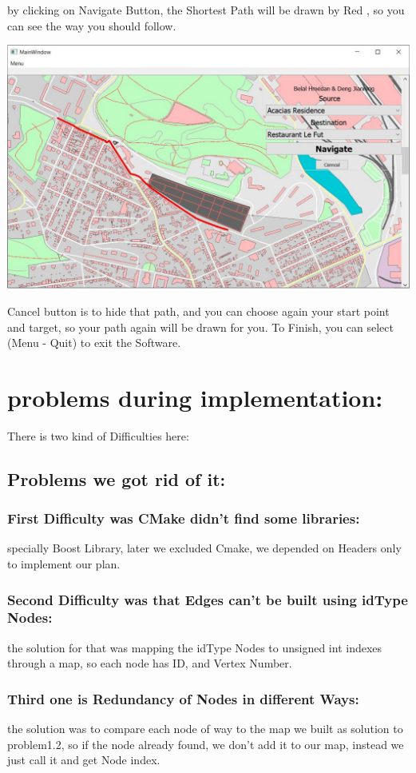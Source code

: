 \documentclass[a4paper,english]{book}
\begin{document}
by clicking on Navigate Button, the Shortest Path will be drawn by Red , so you can see the way you should follow.
\begin{center}
\includegraphics[width=.6\textwidth]{GUI_Map2.JPG}
\end{center}
Cancel button is to hide that path, and you can choose again your start point and target, so your path again will be drawn for you.
To Finish, you can select (Menu - Quit) to exit the Software.
\section{problems during implementation:}
There is two kind of Difficulties here:
\subsection{Problems we got rid of it:} 
\subsubsection{First Difficulty was CMake didn’t find some libraries:}
specially Boost Library, later we excluded Cmake, we depended on Headers only to implement our plan.
\subsubsection{Second Difficulty was that Edges can’t be built using idType Nodes:} the solution for that was mapping the idType Nodes to unsigned int indexes through a map, so each node has ID, and Vertex Number.
\subsubsection{Third one is Redundancy of Nodes in different Ways:} the solution was to compare each node of way to the map we built as solution to problem1.2, so if the node already found, we don’t add it to our map, instead we just call it and get Node index.
\end{document}
